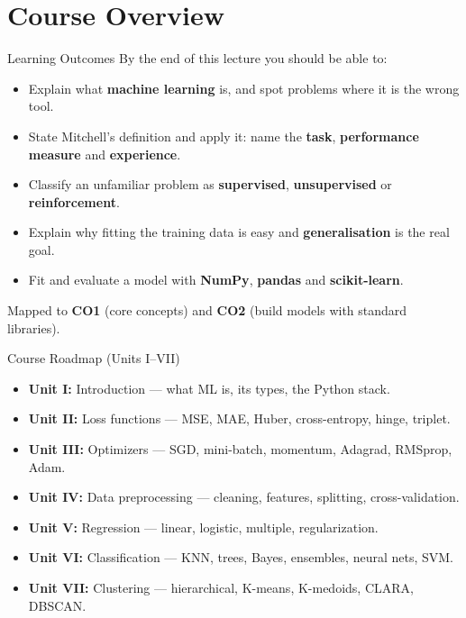 \documentclass[aspectratio=169]{beamer}
\begin{document}
\section{Course Overview}
\label{sec:course}

\begin{frame}{Learning Outcomes}
  By the end of this lecture you should be able to:
  \begin{itemize}[<+->]
    \item Explain what \textbf{machine learning} is, and spot problems where it is the wrong tool.
    \item State Mitchell's definition and apply it: name the \textbf{task}, \textbf{performance measure} and \textbf{experience}.
    \item Classify an unfamiliar problem as \textbf{supervised}, \textbf{unsupervised} or \textbf{reinforcement}.
    \item Explain why fitting the training data is easy and \textbf{generalisation} is the real goal.
    \item Fit and evaluate a model with \textbf{NumPy}, \textbf{pandas} and \textbf{scikit-learn}.
  \end{itemize}
  \vspace{0.3em}
  Mapped to \textbf{CO1} (core concepts) and \textbf{CO2} (build models with standard libraries).
\end{frame}

\begin{frame}[shrink=8]{Course Roadmap (Units I--VII)}
  \begin{itemize}[<+->]
    \item \textbf{Unit I:} Introduction --- what ML is, its types, the Python stack.
    \item \textbf{Unit II:} Loss functions --- MSE, MAE, Huber, cross-entropy, hinge, triplet.
    \item \textbf{Unit III:} Optimizers --- SGD, mini-batch, momentum, Adagrad, RMSprop, Adam.
    \item \textbf{Unit IV:} Data preprocessing --- cleaning, features, splitting, cross-validation.
    \item \textbf{Unit V:} Regression --- linear, logistic, multiple, regularization.
    \item \textbf{Unit VI:} Classification --- KNN, trees, Bayes, ensembles, neural nets, SVM.
    \item \textbf{Unit VII:} Clustering --- hierarchical, K-means, K-medoids, CLARA, DBSCAN.
  \end{itemize}
  \vspace{0.3em}
\end{frame}
\end{document}
